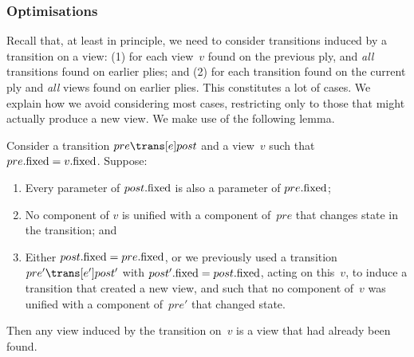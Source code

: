 
\subsubsection{Optimisations}

Recall that, at least in principle, we need to consider transitions induced by
a transition on a view: (1) for each view~$v$ found on the previous ply, and
\emph{all} transitions found on earlier plies; and (2) for each transition
found on the current ply and \emph{all} views found on earlier plies.  This
constitutes a lot of cases.  We explain how we avoid considering most cases,
restricting only to those that might actually produce a new view.  We make use
of the following lemma.


\begin{lemma}\label{lem:mightGiveSufficientUnifs}
Consider a transition $pre \trans[e] post$ and a view~$v$ such that
$pre.\mathrm{fixed} = v.\mathrm{fixed}$.   Suppose:
%
\begin{enumerate}
\item\label{cond:mightGiveSufficientUnifs-1}
  Every parameter of $post.\mathrm{fixed}$ is also a parameter of $pre.\mathrm{fixed}$;

\item\label{cond:mightGiveSufficientUnifs-2}
  No component of $v$ is unified with 
  a component of~$pre$ that changes state in the transition; and

\item\label{cond:mightGiveSufficientUnifs-3}
  Either $post.\mathrm{fixed} = pre.\mathrm{fixed}$, or we previously used a transition
  $pre' \trans[e'] post'$ with $post'.\mathrm{fixed} = post.\mathrm{fixed}$, acting on
  this~$v$, to induce a transition that created a new view, and such that no
  component of~$v$ was unified with a component of~$pre'$ that changed state.
\end{enumerate}
%
Then any view induced by the transition on~$v$ is a view that had already been
found. 
\end{lemma}


